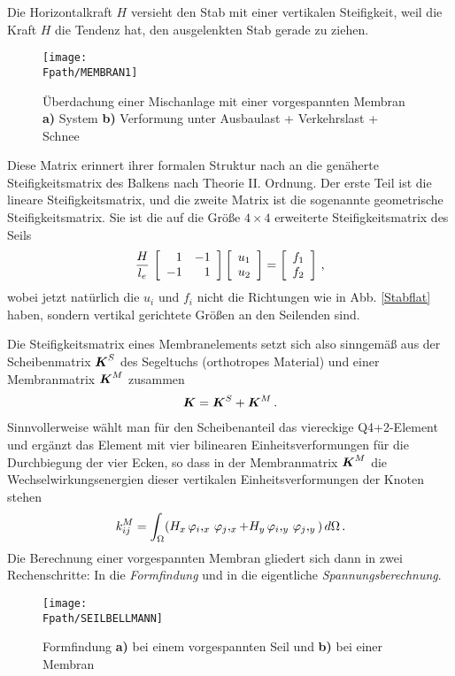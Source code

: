 Die Horizontalkraft $H$ versieht den Stab mit einer vertikalen Steifigkeit, weil die
Kraft $H$ die Tendenz hat, den ausgelenkten Stab gerade zu ziehen.
\begin{figure}[tbp] \centering
\if {} \sidecaption \fi
\texttt{[image: \\Fpath/MEMBRAN1]}
\caption{\"{U}berdachung einer Mischanlage mit einer vorgespannten Membran {\bf a)} System
{\bf b)} Verformung unter Ausbaulast + Verkehrslast + Schnee}  \label{Membran1}
\end{figure}%

Diese Matrix erinnert ihrer formalen Struktur nach an die gen\"{a}herte Steifigkeitsmatrix des Balkens nach Theorie II. Ordnung. Der erste Teil ist die lineare Steifigkeitsmatrix, und die zweite Matrix ist die sogenannte geometrische Steifigkeitsmatrix. Sie ist die auf die Gr\"{o}{\ss}e $4 \times  4$ erweiterte Steifigkeitsmatrix des Seils
\begin{align}
\frac{H}{l_e}\,\left[\barr{r r} 1 & - 1 \\ - 1 & 1 \earr \right] \left[\barr {c} u_1 \\
u_2 \earr \right] = \left[\barr {c} f_1 \\ f_2 \earr \right]\,,
\end{align}
wobei jetzt nat\"{u}rlich die $u_i$ und $f_i$ nicht die Richtungen wie in Abb. \ref{Stabflat} haben, sondern vertikal gerichtete Gr\"{o}{\ss}en an den Seilenden sind.

Die Steifigkeitsmatrix eines Membranelements setzt sich also sinngem\"{a}{\ss} aus der Scheibenmatrix $\vek K^S$ des Segeltuchs (orthotropes Material) und einer Membranmatrix $\vek K^M$ zusammen
\begin{align}
\vek K = \vek K^S + \vek K^M\,.
\end{align}
Sinnvollerweise w\"{a}hlt man f\"{u}r den Scheibenanteil das viereckige Q4+2-Element und erg\"{a}nzt
das Element mit vier bilinearen Einheitsverformungen f\"{u}r die Durchbiegung der vier
Ecken, so dass in der Membranmatrix $\vek K^M$ die Wechselwirkungsenergien dieser vertikalen
Einheitsverformungen der Knoten stehen
\begin{align}
k^M_{ij} = \int_{\Omega} (H_x\,\Np_i,_x\,\Np_j,_x + H_y\,\Np_i,_y\,\Np_j,_y)\,d\Omega\,.
\end{align}
Die Berechnung einer vorgespannten Membran gliedert sich dann in zwei Rechenschritte: In
die {\em Formfindung\/} und in die eigentliche {\em Spannungsberechnung\/}.
\begin{figure}[tbp] \centering
\if {} \sidecaption \fi
\texttt{[image: \\Fpath/SEILBELLMANN]}
\caption{Formfindung {\bf a)} bei einem vorgespannten Seil und {\bf b)} bei einer
Membran}  \label{SeilBellmann}
\end{figure}%


